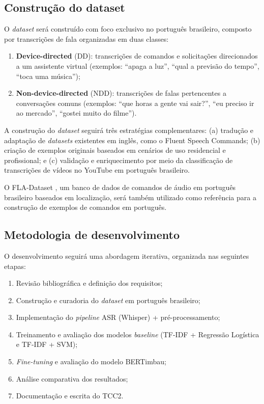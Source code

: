 \documentclass[
    12pt,                %
    openright,           %
    oneside,             %
    a4paper,             %
    english,             %
    brazil               %
]{abntex2}
\begin{document}
\subsection{Construção do dataset}

O \textit{dataset} será construído com foco exclusivo no português brasileiro, composto por transcrições de fala organizadas em duas classes:

\begin{enumerate}
    \item \textbf{Device-directed} (DD): transcrições de comandos e solicitações direcionados a um assistente virtual (exemplos: ``apaga a luz'', ``qual a previsão do tempo'', ``toca uma música'');
    \item \textbf{Non-device-directed} (NDD): transcrições de falas pertencentes a conversações comuns (exemplos: ``que horas a gente vai sair?'', ``eu preciso ir ao mercado'', ``gostei muito do filme'').
\end{enumerate}

A construção do \textit{dataset} seguirá três estratégias complementares: (a) tradução e adaptação de \textit{datasets} existentes em inglês, como o Fluent Speech Commands; (b) criação de exemplos originais baseados em cenários de uso residencial e profissional; e (c) validação e enriquecimento por meio da classificação de transcrições de vídeos no YouTube em português brasileiro.

O FLA-Dataset \cite{Rocha2024}, um banco de dados de comandos de áudio em português brasileiro baseados em localização, será também utilizado como referência para a construção de exemplos de comandos em português.

\subsection{Metodologia de desenvolvimento}

O desenvolvimento seguirá uma abordagem iterativa, organizada nas seguintes etapas:

\begin{enumerate}
    \item Revisão bibliográfica e definição dos requisitos;
    \item Construção e curadoria do \textit{dataset} em português brasileiro;
    \item Implementação do \textit{pipeline} ASR (Whisper) + pré-processamento;
    \item Treinamento e avaliação dos modelos \textit{baseline} (TF-IDF + Regressão Logística e TF-IDF + SVM);
    \item \textit{Fine-tuning} e avaliação do modelo BERTimbau;
    \item Análise comparativa dos resultados;
    \item Documentação e escrita do TCC2.
\end{enumerate}
\end{document}
